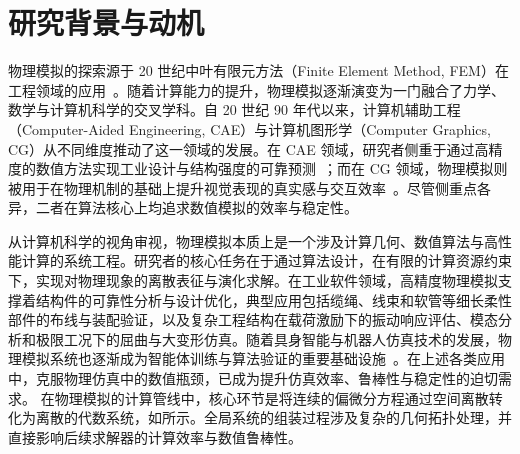 
\section{研究背景与动机}
物理模拟的探索源于 20 世纪中叶有限元方法（Finite Element Method, FEM）在工程领域的应用~\cite{hughes2012finite}。随着计算能力的提升，物理模拟逐渐演变为一门融合了力学、数学与计算机科学的交叉学科。自 20 世纪 90 年代以来，计算机辅助工程（Computer-Aided Engineering, CAE）与计算机图形学（Computer Graphics, CG）从不同维度推动了这一领域的发展。在 CAE 领域，研究者侧重于通过高精度的数值方法实现工业设计与结构强度的可靠预测~\cite{bathe2006finite}；而在 CG 领域，物理模拟则被用于在物理机制的基础上提升视觉表现的真实感与交互效率~\cite{nealen2006physically}。尽管侧重点各异，二者在算法核心上均追求数值模拟的效率与稳定性。

从计算机科学的视角审视，物理模拟本质上是一个涉及计算几何、数值算法与高性能计算的系统工程。研究者的核心任务在于通过算法设计，在有限的计算资源约束下，实现对物理现象的离散表征与演化求解。在工业软件领域，高精度物理模拟支撑着结构件的可靠性分析与设计优化，典型应用包括缆绳、线束和软管等细长柔性部件的布线与装配验证，以及复杂工程结构在载荷激励下的振动响应评估、模态分析和极限工况下的屈曲与大变形仿真。随着具身智能与机器人仿真技术的发展，物理模拟系统也逐渐成为智能体训练与算法验证的重要基础设施~\cite{todorov2012mujoco}。在上述各类应用中，克服物理仿真中的数值瓶颈，已成为提升仿真效率、鲁棒性与稳定性的迫切需求。
在物理模拟的计算管线中，核心环节是将连续的偏微分方程通过空间离散转化为离散的代数系统，如所示。全局系统的组装过程涉及复杂的几何拓扑处理，并直接影响后续求解器的计算效率与数值鲁棒性。


